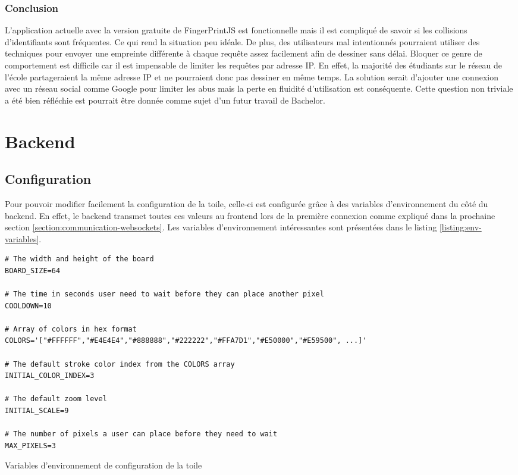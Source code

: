 \subsubsection{Conclusion}

L'application actuelle avec la version gratuite de FingerPrintJS est fonctionnelle mais il est compliqué de savoir si les collisions d'identifiants sont fréquentes. Ce qui rend la situation peu idéale. De plus, des utilisateurs mal intentionnés pourraient utiliser des techniques pour envoyer une empreinte différente à chaque requête assez facilement afin de dessiner sans délai. Bloquer ce genre de comportement est difficile car il est impensable de limiter les requêtes par adresse IP. En effet, la majorité des étudiants sur le réseau de l'école partageraient la même adresse IP et ne pourraient donc pas dessiner en même temps. La solution serait d'ajouter une connexion avec un réseau social comme Google pour limiter les abus mais la perte en fluidité d'utilisation est conséquente. Cette question non triviale a été bien réfléchie est pourrait être donnée comme sujet d'un futur travail de Bachelor.

\section{Backend}

\subsection{Configuration}

Pour pouvoir modifier facilement la configuration de la toile, celle-ci est configurée grâce à des variables d'environnement du côté du backend. En effet, le backend transmet toutes ces valeurs au frontend lors de la première connexion comme expliqué dans la prochaine section \ref{section:communication-websockets}. Les variables d'environnement intéressantes sont présentées dans le listing \ref{listing:env-variables}.

\begin{listing}[H]
  \begin{verbatim}
# The width and height of the board
BOARD_SIZE=64

# The time in seconds user need to wait before they can place another pixel
COOLDOWN=10

# Array of colors in hex format
COLORS='["#FFFFFF","#E4E4E4","#888888","#222222","#FFA7D1","#E50000","#E59500", ...]'

# The default stroke color index from the COLORS array
INITIAL_COLOR_INDEX=3

# The default zoom level
INITIAL_SCALE=9

# The number of pixels a user can place before they need to wait
MAX_PIXELS=3
\end{verbatim}
  \caption{Variables d'environnement de configuration de la toile}
  \label{listing:env-variables}
\end{listing}

